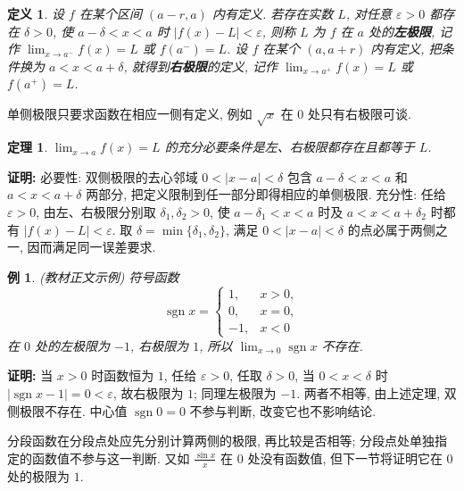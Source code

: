 \documentclass[UTF8,openany]{ctexbook}
\theoremstyle{chinesetextbook}
\newtheorem{definition}{定义}[section]
\newtheorem{example}{例}[section]
\newtheorem{theorem}{定理}[section]
\newenvironment{cnproof}{\par\indent\textbf{证明:} \ignorespaces}{\par}
\begin{document}
\begin{definition}
设 $f$ 在某个区间 $(a-r,a)$ 内有定义. 若存在实数 $L$, 对任意 $\varepsilon>0$ 都存在 $\delta>0$, 使 $a-\delta<x<a$ 时 $|f(x)-L|<\varepsilon$, 则称 $L$ 为 $f$ 在 $a$ 处的\textbf{左极限}, 记作 $\displaystyle\lim_{x\to a^-}f(x)=L$ 或 $f(a^-)=L$. 设 $f$ 在某个 $(a,a+r)$ 内有定义, 把条件换为 $a<x<a+\delta$, 就得到\textbf{右极限}的定义, 记作 $\displaystyle\lim_{x\to a^+}f(x)=L$ 或 $f(a^+)=L$.
\end{definition}
单侧极限只要求函数在相应一侧有定义, 例如 $\sqrt x$ 在 $0$ 处只有右极限可谈.
\begin{theorem}
$\displaystyle \lim_{x\to a}f(x)=L$ 的充分必要条件是左、右极限都存在且都等于 $L$.
\end{theorem}
\begin{cnproof}
必要性: 双侧极限的去心邻域 $0<|x-a|<\delta$ 包含 $a-\delta<x<a$ 和 $a<x<a+\delta$ 两部分, 把定义限制到任一部分即得相应的单侧极限. 充分性: 任给 $\varepsilon>0$, 由左、右极限分别取 $\delta_1,\delta_2>0$, 使 $a-\delta_1<x<a$ 时及 $a<x<a+\delta_2$ 时都有 $|f(x)-L|<\varepsilon$. 取 $\delta=\min\{\delta_1,\delta_2\}$, 满足 $0<|x-a|<\delta$ 的点必属于两侧之一, 因而满足同一误差要求.
\end{cnproof}
\begin{example}
\textnormal{(教材正文示例)} 符号函数
\[
\operatorname{sgn}x=\begin{cases}1,&x>0,\\0,&x=0,\\-1,&x<0\end{cases}
\]
在 $0$ 处的左极限为 $-1$, 右极限为 $1$, 所以 $\displaystyle\lim_{x\to0}\operatorname{sgn}x$ 不存在.
\end{example}
\begin{cnproof}
当 $x>0$ 时函数恒为 $1$, 任给 $\varepsilon>0$, 任取 $\delta>0$, 当 $0<x<\delta$ 时 $|\operatorname{sgn}x-1|=0<\varepsilon$, 故右极限为 $1$; 同理左极限为 $-1$. 两者不相等, 由上述定理, 双侧极限不存在. 中心值 $\operatorname{sgn}0=0$ 不参与判断, 改变它也不影响结论.
\end{cnproof}
分段函数在分段点处应先分别计算两侧的极限, 再比较是否相等; 分段点处单独指定的函数值不参与这一判断. 又如 $\displaystyle\frac{\sin x}x$ 在 $0$ 处没有函数值, 但下一节将证明它在 $0$ 处的极限为 $1$.
\end{document}
